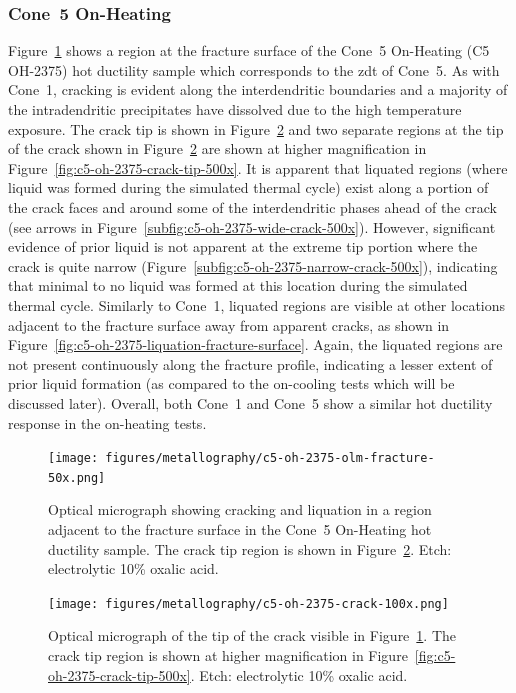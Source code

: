 {\subsubsection{Cone~5 On-Heating}
Figure~\ref{fig:c5-oh-2375-olm-fracture} shows a region at the fracture surface of the Cone~5 On-Heating  (C5 OH-2375) hot ductility sample which corresponds to the \gls{zdt} of Cone~5. As with Cone~1, cracking is evident along the interdendritic boundaries and a majority of the intradendritic precipitates have dissolved due to the high temperature exposure. The crack tip is shown in Figure~\ref{fig:c5-oh-2375-crack-100x} and two separate regions at the tip of the crack shown in Figure~\ref{fig:c5-oh-2375-crack-100x} are shown at higher magnification in Figure~\ref{fig:c5-oh-2375-crack-tip-500x}. It is apparent that liquated regions (where liquid was formed during the simulated thermal cycle) exist along a portion of the crack faces and around some of the interdendritic phases ahead of the crack (see arrows in Figure~\ref{subfig:c5-oh-2375-wide-crack-500x}). However, significant evidence of prior liquid is not apparent at the extreme tip portion where the crack is quite narrow (Figure~\ref{subfig:c5-oh-2375-narrow-crack-500x}), indicating that minimal to no liquid was formed at this location during the simulated thermal cycle. Similarly to Cone~1, liquated regions are visible at other locations adjacent to the fracture surface away from apparent cracks, as shown in Figure~\ref{fig:c5-oh-2375-liquation-fracture-surface}. Again, the liquated regions are not present continuously along the fracture profile, indicating a lesser extent of prior liquid formation (as compared to the on-cooling tests which will be discussed later). Overall, both Cone~1 and Cone~5 show a similar hot ductility response in the on-heating tests.


\begin{figure}
    \centering
    \texttt{[image: figures/metallography/c5-oh-2375-olm-fracture-50x.png]}
    \caption{Optical micrograph showing cracking and liquation in a region adjacent to the fracture surface in the Cone~5 On-Heating \protect{} hot ductility sample. The crack tip region is shown in Figure~\ref{fig:c5-oh-2375-crack-100x}. Etch: electrolytic 10\% oxalic acid.}
    \label{fig:c5-oh-2375-olm-fracture}
\end{figure}

\begin{figure}
    \centering
    \texttt{[image: figures/metallography/c5-oh-2375-crack-100x.png]}
    \caption{Optical micrograph of the tip of the crack visible in Figure~\ref{fig:c5-oh-2375-olm-fracture}. The crack tip region is shown at higher magnification in Figure~\ref{fig:c5-oh-2375-crack-tip-500x}. Etch: electrolytic 10\% oxalic acid.}
    \label{fig:c5-oh-2375-crack-100x}
\end{figure}

}
